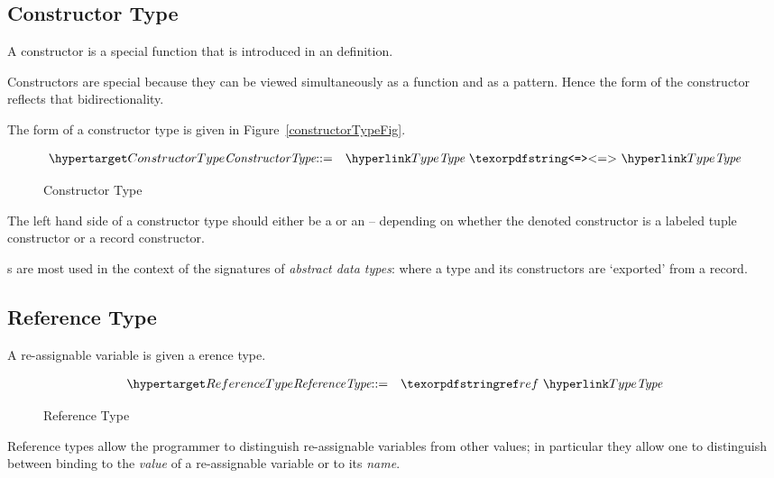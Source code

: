 \subsection{Constructor Type}
\label{constructorType}

A constructor is a special function that is introduced in an  definition.
\begin{aside}
Constructors are special because they can be viewed simultaneously as a function and as a pattern. Hence the form of the constructor reflects that bidirectionality.
\end{aside}
The form of a constructor type is given in Figure~\vref{constructorTypeFig}.

\begin{figure}[htbp]
\begin{eqnarray*}
\ntDef{ConstructorType}&\arrow&\ntRef{Type}\ \q{<=>}\ \ntRef{Type}
\end{eqnarray*}
\caption{Constructor Type}
\label{constructorTypeFig}
\end{figure}
The left hand side of a constructor type should either be a  or an  -- depending on whether the denoted constructor is a labeled tuple constructor or a record constructor.
\begin{aside}
s are most used in the context of the signatures of \emph{abstract data types}: where a type and its constructors are `exported' from a record.
\end{aside}

\subsection{Reference Type}
\label{referenceType}
A re-assignable variable is given a erence type.

\begin{figure}[H]
\begin{eqnarray*}
\ntDef{ReferenceType}&\arrow&\q{ref}\ \ntRef{Type}
\end{eqnarray*}
\caption{Reference Type}
\label{referenceTypeFig}
\end{figure}

Reference types allow the programmer to distinguish re-assignable variables from other values; in particular they allow one to distinguish between binding to the \emph{value} of a re-assignable variable or to its \emph{name}.

